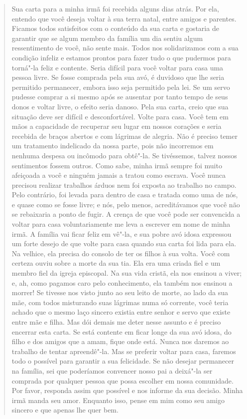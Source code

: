 \begin{quote}
Sua carta para a minha irmã foi
recebida alguns dias atrás. Por ela, entendo que você deseja voltar à
sua terra natal, entre amigos e parentes. Ficamos todos satisfeitos com
o conteúdo da sua carta e gostaria de garantir que se algum membro da
família um dia sentiu algum ressentimento de você, não sente mais. Todos
nos solidarizamos com a sua condição infeliz e estamos prontos para
fazer tudo o que pudermos para torná"-la feliz e contente. Seria difícil
para você voltar para casa uma pessoa livre. Se fosse comprada pela sua
avó, é duvidoso que lhe seria permitido permanecer, embora isso seja
permitido pela lei. Se um servo pudesse comprar a si mesmo após se
ausentar por tanto tempo de seus donos e voltar livre, o efeito seria
danoso. Pela sua carta, creio que sua situação deve ser difícil e
desconfortável. Volte para casa. Você tem em mãos a capacidade de
recuperar seu lugar em nossos corações e seria recebida de braços
abertos e com lágrimas de alegria. Não é preciso temer um tratamento
indelicado da nossa parte, pois não incorremos em nenhuma despesa ou
incômodo para obtê"-la. Se tivéssemos, talvez nossos sentimentos fossem
outros. Como sabe, minha irmã sempre foi muito afeiçoada a você e
ninguém jamais a tratou como escrava. Você nunca precisou realizar
trabalhos árduos nem foi exposta ao trabalho no campo. Pelo contrário,
foi levada para dentro de casa e tratada como uma de nós, e quase como
se fosse livre; e nós, pelo menos, acreditávamos que você não se
rebaixaria a ponto de fugir. A crença de que você pode ser convencida a
voltar para casa voluntariamente me leva a escrever em nome de minha
irmã. A família vai ficar feliz em vê"-la, e sua pobre avó idosa
expressou um forte desejo de que volte para casa quando sua carta foi
lida para ela. Na velhice, ela precisa do consolo de ter os filhos à sua
volta. Você com certeza ouviu sobre a morte da sua tia. Ela era uma
criada fiel e um membro fiel da igreja episcopal. Na sua vida cristã,
ela nos ensinou a viver; e, ah, como pagamos caro pelo conhecimento, ela
também nos ensinou a morrer! Se tivesse nos visto junto ao seu leito de
morte, ao lado da sua mãe, com todos misturando suas lágrimas numa só
corrente, você teria achado que o mesmo laço sincero existia entre
senhor e servo que existe entre mãe e filha. Mas dói demais me deter
nesse assunto e é preciso encerrar esta carta. Se está contente em ficar
longe da sua avó idosa, do filho e dos amigos que a amam, fique onde
está. Nunca nos daremos ao trabalho de tentar apreendê"-la. Mas se
preferir voltar para casa, faremos todo o possível para garantir a sua
felicidade. Se não desejar permanecer na família, sei que poderíamos
convencer nosso pai a deixá"-la ser comprada por qualquer pessoa que
possa escolher em nossa comunidade. Por favor, responda assim que
possível e nos informe da sua decisão. Minha irmã manda seu amor.
Enquanto isso, pense em mim como seu amigo sincero e que apenas lhe quer
bem.
\end{quote}

